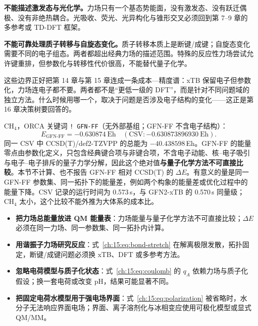 \textbf{不能描述激发态与光化学。}力场只有一个基态势能面，没有激发态、没有跃迁偶极、没有非绝热耦合。光吸收、荧光、光异构化与锥形交叉必须回到第 7--9 章的多参考或 TD-DFT 框架。

\textbf{不能可靠处理质子转移与自旋态变化。}质子转移本质上是断键/成键；自旋态变化需要不同的电子组态。两者都超出经典力场的描述范围。特殊的反应性力场尝试允许键重排，但参数化与转移性代价很高，不能替代量子化学。

这些边界正好把第 14 章与第 15 章连成一条成本—精度谱：xTB 保留电子但参数化，力场连电子都不要。两者都不是“更低一级的 DFT”，而是针对不同问题域的独立方法。什么时候用哪一个，取决于问题是否涉及电子结构的变化——这正是第 16 章决策树要回答的。

\begin{ch4box}
CH$_4$，ORCA 关键词 \texttt{! GFN-FF}（无外部基组；GFN-FF 不含电子结构）：
\[
E_{\text{GFN-FF}} = -0.630874\ \mathrm{Eh}
\quad(\text{CSV}: -0.630873896930\ \mathrm{Eh}).
\]
同一 CSV 中 CCSD(T)/def2-TZVPP 的总能为 $-40.438598$\,Eh。GFN-FF 的能量零点由参数化定义，只包含经典键合项与非键合项，不含电子动能、核--电子吸引与电子--电子排斥的量子力学分解，因此这个绝对值\textbf{与量子化学方法不可直接比较}。本节不计算、也不报告 GFN-FF 相对 CCSD(T) 的 $\Delta E$。有意义的量是同一 GFN-FF 参数集、同一拓扑下的能量差，例如两个构象的能量差或优化过程中的能量下降。CSV 记录的运行时间为 0.573\,s，与 GFN2-xTB 的 0.570\,s 同量级；CH$_4$ 太小，这个比较不能外推为大体系的成本比。
\end{ch4box}

\begin{pitfall}
\begin{itemize}
  \item \textbf{把力场总能量放进 QM 能量表}：力场能量与量子化学方法不可直接比较；$\Delta E$ 必须在同一力场、同一参数集、同一拓扑内计算。
  \item \textbf{用谐振子力场研究反应}：式~\eqref{ch:15:eq:bond-stretch} 在解离极限发散，拓扑固定，断键/成键问题必须换 xTB、DFT 或多参考方法。
  \item \textbf{忽略电荷模型与质子化状态}：式~\eqref{ch:15:eq:coulomb} 的 $q_A$ 依赖力场与质子化假设；换一套电荷或改变 pH，结果可能显著不同。
  \item \textbf{把固定电荷水模型用于强电场界面}：式~\eqref{ch:15:eq:polarization} 被省略时，水分子无法响应界面电场；界面、离子溶剂化与冰相变应使用可极化模型或显式 QM/MM。
\end{itemize}
\end{pitfall}

